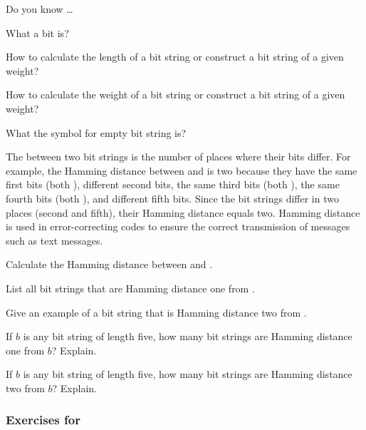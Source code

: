 \begin{exer}[\exerR] %
\label{exer_dyk_defnbs}
    Do you know \ldots
        \begin{exerpart}
            \item What a bit is?
            \item How to calculate the length of a bit string or construct a bit string of a given weight?
            \item How to calculate the weight of a bit string or construct a bit string of a given weight? 
            \item What the symbol for empty bit string is?
        \end{exerpart}
\end{exer}

\begin{exer}[\exerE] %
\label{exer_hamming_distance}  
    The  between two bit strings is the number of places where their bits differ.  For example, the Hamming distance between  and  is two because they have the same first bits (both ), different second bits, the same third bits (both ), the same fourth bits (both ), and different fifth bits.  Since the bit strings differ in two places (second and fifth), their Hamming distance equals two.  Hamming distance is used in error-correcting codes to ensure the correct transmission of messages such as text messages.
        \begin{apart}
            \item Calculate the Hamming distance between  and .
            \item List all bit strings that are Hamming distance one from .
            \item Give an example of a bit string that is Hamming distance two from .
            \item If $b$ is any bit string of length five, how many bit strings are Hamming distance one from $b$?  Explain.
            \item If $b$ is any bit string of length five, how many bit strings are Hamming distance two from $b$?  Explain.
        \end{apart}
\end{exer}

\subsubsection*{Exercises for  \subcountbitstrings}

